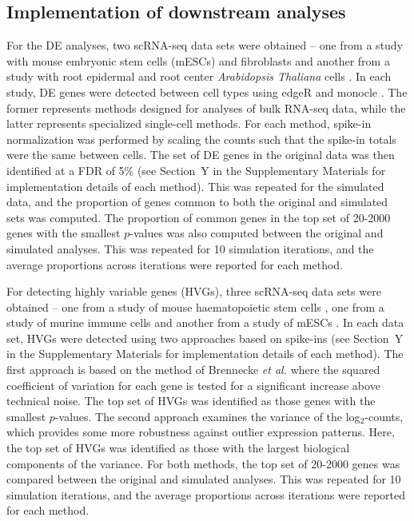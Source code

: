 \documentclass{article}
\begin{document}
\subsection{Implementation of downstream analyses}
For the DE analyses, two scRNA-seq data sets were obtained -- one from a study with mouse embryonic stem cells (mESCs) and fibroblasts \cite{islam2011characterization} and another from a study with root epidermal and root center \textit{Arabidopsis Thaliana} cells \cite{brennecke2013accounting}.
In each study, DE genes were detected between cell types using edgeR \cite{robinson2010edgeR,lund2012detecting} and monocle \cite{trapnell2014dynamics}.
The former represents methods designed for analyses of bulk RNA-seq data, while the latter represents specialized single-cell methods.
For each method, spike-in normalization was performed by scaling the counts such that the spike-in totals were the same between cells.
The set of DE genes in the original data was then identified at a FDR of 5\% (see Section~Y in the Supplementary Materials for implementation details of each method).
This was repeated for the simulated data, and the proportion of genes common to both the original and simulated sets was computed.
The proportion of common genes in the top set of 20-2000 genes with the smallest $p$-values was also computed between the original and simulated analyses.
This was repeated for 10 simulation iterations, and the average proportions across iterations were reported for each method.

For detecting highly variable genes (HVGs), three scRNA-seq data sets were obtained -- one from a study of mouse haematopoietic stem cells \cite{wilson2015combined}, one from a study of murine immune cells \cite{brennecke2013accounting} and another from a study of mESCs \cite{islam2014quantitative}.
In each data set, HVGs were detected using two approaches based on spike-ins (see Section~Y in the Supplementary Materials for implementation details of each method).
The first approach is based on the method of Brennecke \textit{et al.} \cite{brennecke2013accounting} where the squared coefficient of variation for each gene is tested for a significant increase above technical noise.
The top set of HVGs was identified as those genes with the smallest $p$-values.
The second approach examines the variance of the log$_2$-counts, which provides some more robustness against outlier expression patterns.
Here, the top set of HVGs was identified as those with the largest biological components of the variance.
For both methods, the top set of 20-2000 genes was compared between the original and simulated analyses.
This was repeated for 10 simulation iterations, and the average proportions across iterations were reported for each method.
\end{document}
